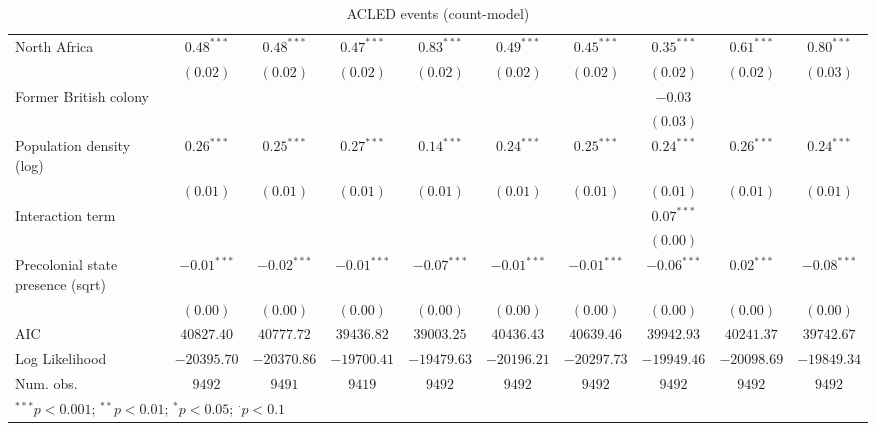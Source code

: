 \begin{sidewaystable}
\begin{center}
{\begin{tabular}{l c c c c c c c c c}
North Africa                          & $0.48^{***}$  & $0.48^{***}$  & $0.47^{***}$  & $0.83^{***}$  & $0.49^{***}$  & $0.45^{***}$  & $0.35^{***}$  & $0.61^{***}$  & $0.80^{***}$  \\
                                      & $(0.02)$      & $(0.02)$      & $(0.02)$      & $(0.02)$      & $(0.02)$      & $(0.02)$      & $(0.02)$      & $(0.02)$      & $(0.03)$      \\
Former British colony                 &               &               &               &               &               &               & $-0.03$       &               &               \\
                                      &               &               &               &               &               &               & $(0.03)$      &               &               \\
Population density (log)              & $0.26^{***}$  & $0.25^{***}$  & $0.27^{***}$  & $0.14^{***}$  & $0.24^{***}$  & $0.25^{***}$  & $0.24^{***}$  & $0.26^{***}$  & $0.24^{***}$  \\
                                      & $(0.01)$      & $(0.01)$      & $(0.01)$      & $(0.01)$      & $(0.01)$      & $(0.01)$      & $(0.01)$      & $(0.01)$      & $(0.01)$      \\
Interaction term                      &               &               &               &               &               &               & $0.07^{***}$  &               &               \\
                                      &               &               &               &               &               &               & $(0.00)$      &               &               \\
Precolonial state presence (sqrt)     & $-0.01^{***}$ & $-0.02^{***}$ & $-0.01^{***}$ & $-0.07^{***}$ & $-0.01^{***}$ & $-0.01^{***}$ & $-0.06^{***}$ & $0.02^{***}$  & $-0.08^{***}$ \\
                                      & $(0.00)$      & $(0.00)$      & $(0.00)$      & $(0.00)$      & $(0.00)$      & $(0.00)$      & $(0.00)$      & $(0.00)$      & $(0.00)$      \\
\midrule
AIC                                   & $40827.40$    & $40777.72$    & $39436.82$    & $39003.25$    & $40436.43$    & $40639.46$    & $39942.93$    & $40241.37$    & $39742.67$    \\
Log Likelihood                        & $-20395.70$   & $-20370.86$   & $-19700.41$   & $-19479.63$   & $-20196.21$   & $-20297.73$   & $-19949.46$   & $-20098.69$   & $-19849.34$   \\
Num. obs.                             & $9492$        & $9491$        & $9419$        & $9492$        & $9492$        & $9492$        & $9492$        & $9492$        & $9492$        \\
\bottomrule
\multicolumn{10}{l}{\scriptsize{$^{***}p<0.001$; $^{**}p<0.01$; $^{*}p<0.05$; $^{\cdot}p<0.1$}}
\end{tabular}
}
\caption{ACLED events (count-model)}
\label{czacledev}
\end{center}
\end{sidewaystable}
